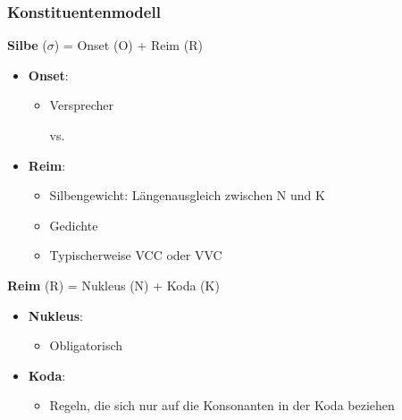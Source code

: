 \begin{frame}
\frametitle{Konstituentenmodell}

\textbf{Silbe} ($\sigma$) = Onset (O) + Reim (R)

\begin{itemize}
	\item \textbf{Onset}: 
	\begin{itemize}
		\item Versprecher
	
	          \ea
                   vs. 
                  \z

	\end{itemize}	
			
	\item \textbf{Reim}: 
	\begin{itemize}
		\item Silbengewicht: Längenausgleich zwischen N und K 		
		\item Gedichte
		\item Typischerweise VCC oder VVC
	\end{itemize}
	
\end{itemize}

\textbf{Reim} (R) = Nukleus (N) + Koda (K)

\begin{itemize}
	\item \textbf{Nukleus}: 
	\begin{itemize}
		\item Obligatorisch
	\end{itemize}	
			
	\item \textbf{Koda}: 
	\begin{itemize}
		\item Regeln, die sich nur auf die Konsonanten in der Koda beziehen
	\end{itemize}
	
\end{itemize}

\end{frame}




